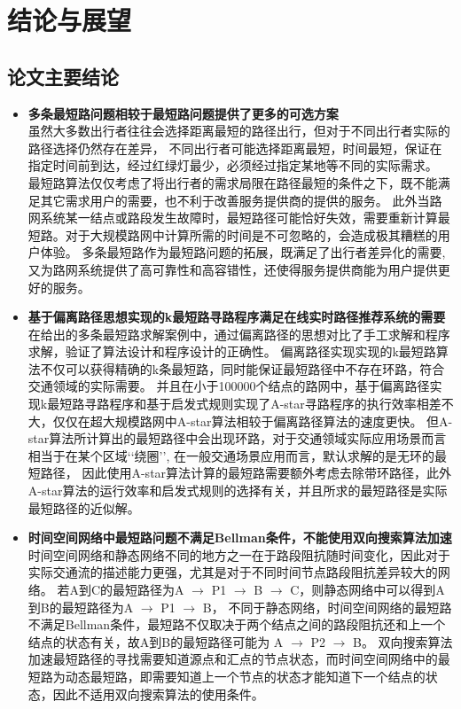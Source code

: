 \chapter{结论与展望}\label{ch:结论与展望}


\section{论文主要结论}\label{sec:论文主要结论}
\begin{itemize}
    \item \textbf{多条最短路问题相较于最短路问题提供了更多的可选方案}\\
    虽然大多数出行者往往会选择距离最短的路径出行，但对于不同出行者实际的路径选择仍然存在差异，
    不同出行者可能选择距离最短，时间最短，保证在指定时间前到达，经过红绿灯最少，必须经过指定某地等不同的实际需求。
    最短路算法仅仅考虑了将出行者的需求局限在路径最短的条件之下，既不能满足其它需求用户的需要，也不利于改善服务提供商的提供的服务。
    此外当路网系统某一结点或路段发生故障时，最短路径可能恰好失效，需要重新计算最短路。对于大规模路网中计算所需的时间是不可忽略的，会造成极其糟糕的用户体验。
    多条最短路作为最短路问题的拓展，既满足了出行者差异化的需要, 又为路网系统提供了高可靠性和高容错性，还使得服务提供商能为用户提供更好的服务。

    \item \textbf{基于偏离路径思想实现的k最短路寻路程序满足在线实时路径推荐系统的需要}\\
    在给出的多条最短路求解案例中，通过偏离路径的思想对比了手工求解和程序求解，验证了算法设计和程序设计的正确性。
    偏离路径实现实现的k最短路算法不仅可以获得精确的k条最短路，同时能保证最短路径中不存在环路，符合交通领域的实际需要。
    并且在小于100000个结点的路网中，基于偏离路径实现k最短路寻路程序和基于启发式规则实现了A-star寻路程序的执行效率相差不大，仅仅在超大规模路网中A-star算法相较于偏离路径算法的速度更快。
    但A-star算法所计算出的最短路径中会出现环路，对于交通领域实际应用场景而言相当于在某个区域\lq\lq{绕圈}\rq\rq, 在一般交通场景应用而言，默认求解的是无环的最短路径，
    因此使用A-star算法计算的最短路需要额外考虑去除带环路径，此外A-star算法的运行效率和启发式规则的选择有关，并且所求的最短路径是实际最短路径的近似解。

    \item \textbf{时间空间网络中最短路问题不满足Bellman条件，不能使用双向搜索算法加速}\\
    时间空间网络和静态网络不同的地方之一在于路段阻抗随时间变化，因此对于实际交通流的描述能力更强，尤其是对于不同时间节点路段阻抗差异较大的网络。
    若A到C的最短路径为A $\to$ P1 $\to$ B $\to$ C，则静态网络中可以得到A到B的最短路径为A $\to$ P1 $\to$ B，
    不同于静态网络，时间空间网络的最短路不满足Bellman条件，最短路不仅取决于两个结点之间的路段阻抗还和上一个结点的状态有关，故A到B的最短路径可能为 A $\to$ P2 $\to$ B。
    双向搜索算法加速最短路径的寻找需要知道源点和汇点的节点状态，而时间空间网络中的最短路为动态最短路，即需要知道上一个节点的状态才能知道下一个结点的状态，因此不适用双向搜索算法的使用条件。


\end{itemize}
